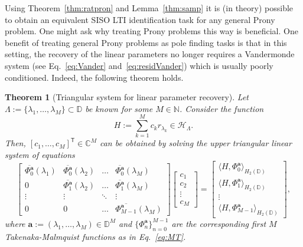 \documentclass{arxiv}
\newcommand{\T}{\mathsf{T}}
\newtheorem{theorem}{Theorem}[section]
\begin{document}
Using Theorem~\ref{thm:ratpron} and Lemma~\ref{thm:samp} it is (in theory) possible to obtain an equivalent SISO LTI identification task for any general Prony problem. One might ask why treating Prony problems this way is beneficial. One benefit of treating general Prony problems as pole finding tasks is that in this setting, the recovery of the linear parameters no longer requires a Vandermonde system (see Eq.~\eqref{eq:Vander} and~\eqref{eq:residVander}) which is usually poorly conditioned. Indeed, the following theorem holds.

\begin{theorem}[Triangular system for linear parameter recovery]
\label{thm:lin}
    Let $\Lambda := \{\lambda_1, \ldots, \lambda_M \} \subset \mathbb{D}$ be known for some $M \in \mathbb{N}$. Consider the function
    $$
        H := \sum_{k=1}^{M} c_kr_{\lambda_k} \in \mathcal{H}_{\Lambda}.
    $$
    Then, $[c_1, \ldots, c_M]^\T \in \mathbb{C}^M$ can be obtained by solving the upper triangular linear system of equations
\begin{equation}
        \label{eq:lintrig}
        \begin{bmatrix}
            \overline{\Phi_0^{\boldsymbol{a}}}(\lambda_1) & \overline{\Phi_0^{\boldsymbol{a}}}(\lambda_2) & \ldots & \overline{\Phi_0^{\boldsymbol{a}}}(\lambda_M) \\
            0 & \overline{\Phi_1^{\boldsymbol{a}}}(\lambda_2) & \ldots & \overline{\Phi_1^{\boldsymbol{a}}}(\lambda_M) \\
            \vdots & \vdots & \ddots & \vdots \\
            0 & 0 & \ldots & \overline{\Phi_{M-1}^{\boldsymbol{a}}}(\lambda_M)
        \end{bmatrix}  \begin{bmatrix}
             c_1  \\
             c_2 \\
             \vdots \\
             c_M
        \end{bmatrix}  = \begin{bmatrix}
             \langle H, \Phi_0^{\boldsymbol{a}} \rangle_{H_2(\mathbb{D})}  \\
             \langle H, \Phi_1^{\boldsymbol{a}} \rangle_{H_2(\mathbb{D})} \\
             \vdots \\
             \langle H, \Phi_{M-1}^{\boldsymbol{a}} \rangle_{H_2(\mathbb{D})}
        \end{bmatrix},
    \end{equation}
   where $\boldsymbol{a} := (\lambda_1, \ldots, \lambda_M) \in \mathbb{D}^M$ and $\{ \Phi_n^{\boldsymbol{a}} \}_{n=0}^{M-1}$ are the corresponding first $M$ Takenaka-Malmquist functions as in Eq.~\eqref{eq:MT}.
\end{theorem}
\end{document}
